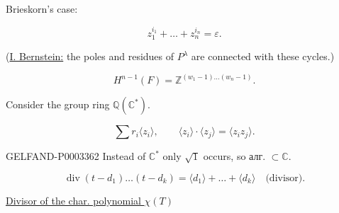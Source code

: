 Brieskorn’s case:

\begin{equation*}z_1^{i_1}+\ldots+z_n^{i_n}=\varepsilon.\end{equation*}

(\uline{I. Bernstein:} the poles and residues of $P^\lambda$ are connected with these cycles.)





\begin{equation*}H^{n-1}(F)=\mathbb Z^{(w_1-1)\ldots (w_n-1)}.\end{equation*}

Consider the group ring $\mathbb Q (\mathbb C^*)$.

\begin{equation*}\sum r_i\langle z_i\rangle,\qquad\langle z_i\rangle\cdot\langle z_j\rangle=\langle z_i z_j\rangle.\end{equation*}

\begin{GelfandAdjacentEvidence}{GELFAND-P000336}{2}
Instead of $\mathbb C^*$ only $\sqrt{1}$ occurs, so алг. $\subset\mathbb C$.

\end{GelfandAdjacentEvidence}


\begin{equation*}\operatorname{div}(t-d_1)\ldots (t-d_k)=\langle d_1\rangle+\ldots+\langle d_k\rangle\quad\text{(divisor).}\end{equation*}

\uline{Divisor of the char. polynomial $\chi (T)$}

